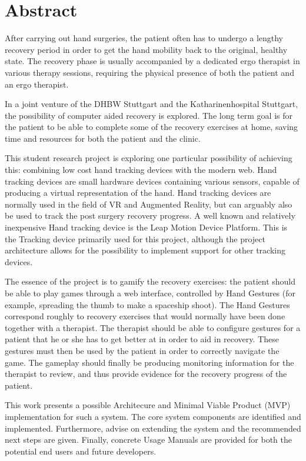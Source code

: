 \chapter{Abstract}

After carrying out hand surgeries, the patient often has to undergo a lengthy recovery period in order to get the hand mobility back to the original, healthy state. The recovery phase is usually accompanied by a dedicated ergo therapist in various therapy sessions, requiring the physical presence of both the patient and an ergo therapist.

In a joint venture of the DHBW Stuttgart and the Katharinenhospital Stuttgart, the possibility of computer aided recovery is explored. The long term goal is for the patient to be able to complete some of the recovery exercises at home, saving time and resources for both the patient and the clinic.

This student research project is exploring one particular possibility of achieving this: combining low cost hand tracking devices with the modern web. Hand tracking devices are small hardware devices containing various sensors, capable of producing a virtual representation of the hand. Hand tracking devices are normally used in the field of VR and Augmented Reality, but can arguably also be used to track the post surgery recovery progress. A well known and relatively inexpensive Hand tracking device is the Leap Motion Device Platform. This is the Tracking device primarily used for this project, although the project architecture allows for the possibility to implement support for other tracking devices.

The essence of the project is to gamify the recovery exercises: the patient should be able to play games through a web interface, controlled by Hand Gestures (for example, spreading the thumb to make a spaceship shoot). The Hand Gestures correspond roughly to recovery exercises that would normally have been done together with a therapist. The therapist should be able to configure gestures for a patient that he or she has to get better at in order to aid in recovery. These gestures must then be used by the patient in order to correctly navigate the game. The gameplay should finally be producing monitoring information for the therapist to review, and thus provide evidence for the recovery progress of the patient.

This work presents a possible Architecure and Minimal Viable Product (MVP) implementation for such a system. The core system components are identified and implemented. Furthermore, advise on extending the system and the recommended next steps are given. Finally, concrete Usage Manuals are provided for both the potential end users and future developers.
